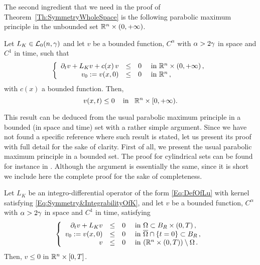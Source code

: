 The second ingredient that we need in the proof of Theorem~\ref{Th:SymmetryWholeSpace} is the following parabolic maximum principle in the unbounded set $\mathbb{R}^n \times (0,+\infty)$. 

\begin{proposition}
	\label{Prop:ParaMaxPrp}
	Let $L_K \in \mathcal{L}_0(n,\gamma)$ and let $v$ be a bounded function, $C^\alpha$ with $\alpha > 2\gamma$ in space and $C^1$ in time, such that
	\begin{equation*}
	\left\{\begin{array}{rcll}
	\partial_t v + L_K  v + c(x)\,v &\leq& 0 & \textrm{ in }\mathbb{R}^n\times(0,+\infty)\,,\\
	v_0:=v(x,0) &\leq& 0 & \textrm{ in } \mathbb{R}^n\,,
	\end{array} \right.
	\end{equation*}
	with $c(x)$ a bounded function. Then,
	$$ v(x,t) \leq 0 \,\,\,\,\,\text{ in } \,\,\, \mathbb{R}^n\times[0,+\infty). $$
\end{proposition}

This result can be deduced from the usual parabolic maximum principle in a bounded (in space and time) set with a rather simple argument. Since we have not found a specific reference where such result is stated, let us present its proof with full detail for the sake of clarity. First of all, we present the usual parabolic maximum principle in a bounded set. The proof for cylindrical sets can be found for instance in \cite{BarriosPeralSoriaValdinoci}. Although the argument is essentially the same, since it is short we include here the complete proof for the sake of completeness.

\begin{lemma}
\label{Lemma:ParabolicmaxPrpBdd}
Let $L_K$ be an integro-differential operator of the form \eqref{Eq:DefOfLu} with kernel satisfying \eqref{Eq:Symmetry&IntegrabilityOfK}, and let $v$ be a bounded function, $C^\alpha$ with $\alpha > 2\gamma$ in space and $C^1$ in time, satisfying
\begin{equation*}
\left\{\begin{array}{rcll}
\partial_t v + L_K v &\leq& 0 & \textrm{ in } \Omega \subset B_R\times(0,T)\,,\\
v_0:=v(x,0) &\leq& 0 & \textrm{ in } \overline{\Omega} \cap \{t=0\} \subset B_R\,,\\
v &\leq& 0 & \textrm{ in } ( \mathbb{R}^n \times (0,T))\setminus \Omega \,.
\end{array} \right.
\end{equation*}
Then, $v\leq 0$ in $\mathbb{R}^n\times [0,T]$.
\end{lemma}

